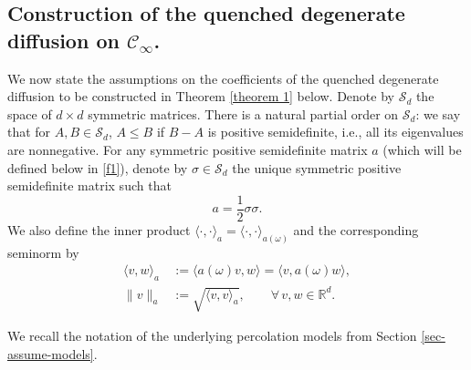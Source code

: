 \documentclass[11pt]{article}
\newcommand{\R}{\mathbb R}
\theoremstyle{rem}
\begin{document}
\subsection{Construction of the quenched degenerate diffusion on $\mathcal C_\infty$.}\label{sec-main-results}

We now state the assumptions on the coefficients of the quenched degenerate diffusion to be constructed in Theorem \ref{theorem 1} below. Denote by $\mathcal{S}_d$ the space of $d\times d$ symmetric matrices. There is a natural partial order on $\mathcal{S}_d$: we say that for $A,B\in \mathcal{S}_d$, $A\leq B$ if $B-A$ is positive semidefinite, i.e., all its eigenvalues are nonnegative. For any symmetric positive semidefinite matrix $a$ (which will be defined below in \ref{f1}), denote by $\sigma\in \mathcal{S}_d$ the unique symmetric positive semidefinite matrix such that
\[
a=\frac12\sigma\sigma.
\]
We also define the inner product $\langle \cdot,\cdot\rangle_a=\langle\cdot,\cdot\rangle_{a(\omega)}$ and the corresponding seminorm by
\begin{equation}\label{eq:a-inner-prod}
\begin{aligned}
\langle v,w\rangle_a
&:=\langle a(\omega)v,w\rangle
=\langle v,a(\omega)w\rangle,
\\
\|v\|_a
&:=\sqrt{\langle v,v\rangle_a},
\qquad \forall\, v,w\in \R^d.
\end{aligned}
\end{equation}

We recall the notation of the underlying percolation models from Section \ref{sec-assume-models}.
\end{document}
